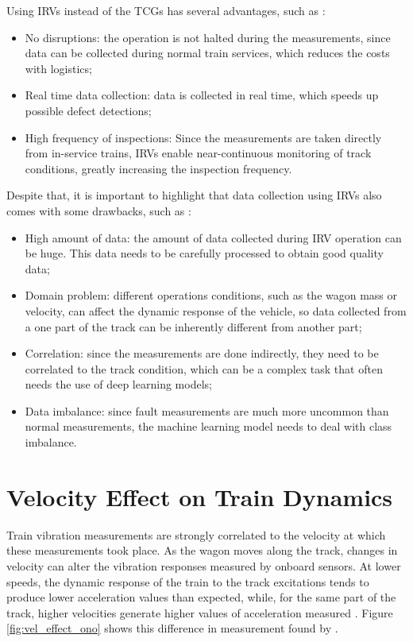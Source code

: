 Using IRVs instead of the TCGs has several advantages, such as \cite{PIRES2024107191,GHIASI2025109516,Hironori_ONO202322-00239}:
\begin{itemize}
    \item No disruptions: the operation is not halted during the measurements, since data can be collected during normal train services, which reduces the costs with logistics;
    \item Real time data collection: data is collected in real time, which speeds up possible defect detections;
    \item High frequency of inspections: Since the measurements are taken directly from in-service trains, IRVs enable near-continuous monitoring of track conditions, greatly increasing the inspection frequency.
\end{itemize}

Despite that, it is important to highlight that data collection using IRVs also comes with some drawbacks, such as \cite{PIRES2024107191,GHIASI2025109516}:
\begin{itemize}
    \item High amount of data: the amount of data collected during IRV operation can be huge. This data needs to be carefully processed to obtain good quality data;
    \item Domain problem: different operations conditions, such as the wagon mass or velocity, can affect the dynamic response of the vehicle, so data collected from a one part of the track can be inherently different from another part;
    \item Correlation: since the measurements are done indirectly, they need to be correlated to the track condition, which can be a complex task that often needs the use of deep learning models;
    \item Data imbalance: since fault measurements are much more uncommon than normal measurements, the machine learning model needs to deal with class imbalance.
\end{itemize}

\section{Velocity Effect on Train Dynamics} \label{sec-vel-effect-measurement}

Train vibration measurements are strongly correlated to the velocity at which these measurements took place. As the wagon moves along the track, changes in velocity can alter the vibration responses measured by onboard sensors. At lower speeds, the dynamic response of the train to the track excitations tends to produce lower acceleration values than expected, while, for the same part of the track, higher velocities generate higher values of acceleration measured \cite{Hironori_ONO202322-00239}. Figure \ref{fig:vel_effect_ono} shows this difference in measurement found by \cite{Hironori_ONO202322-00239}. 

